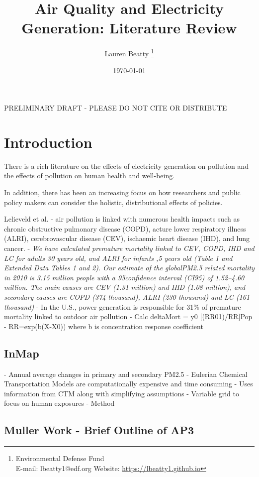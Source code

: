 \documentclass[a4paper]{article}
\title{Air Quality and Electricity Generation: Literature Review}
\author{Lauren Beatty \thanks{Environmental Defense Fund\\  E-mail: lbeatty1@edf.org \hspace{.5cm}Website: \href{https://lbeatty1.github.io}{https://lbeatty1.github.io}}}
\date{\today}
\theoremstyle{definition}
\theoremstyle{plain}
\begin{document}
\maketitle
\begin{center}
    PRELIMINARY DRAFT - PLEASE DO NOT CITE OR DISTRIBUTE
\end{center}


\newpage
\section{Introduction}

There is a rich literature on the effects of electricity generation on pollution and the effects of pollution on human health and well-being.  


In addition, there has been an increasing focus on how researchers and public policy makers can consider the holistic, distributional effects of policies.  

Lelieveld et al.  \citep{Lelieveld2015TheScale}
- air pollution is linked with numerous health impacts such as chronic obstructive pulmonary disease (COPD), acture lower respiratory illness (ALRI), cerebrovascular disease (CEV), ischaemic heart disease (IHD), and lung cancer.
- \textit{We have calculated premature mortality linked to CEV, COPD, IHD and LC for adults 30 years old, and ALRI for infants ,5 years old (Table 1 and Extended Data Tables 1 and 2). Our estimate of the globalPM2.5 related mortality in 2010 is 3.15 million people with a 95confidence interval (CI95) of 1.52–4.60 million. The main causes are CEV (1.31 million) and IHD (1.08 million), and secondary causes are COPD (374 thousand), ALRI (230 thousand) and LC (161 thousand)}
- In the U.S., power generation is responsible for 31$\%$ of premature mortality linked to outdoor air pollution
- Calc deltaMort = y0 [(RR01)/RR]Pop
- RR=exp(b(X-X0)) where b is concentration response coefficient

\subsection{InMap}
\citep{Tessum2017InMAP:Interventions}
- Annual average changes in primary and secondary PM2.5
- Eulerian Chemical Transportation Models are computationally expensive and time consuming
- Uses information from CTM along with simplifying assumptions
- Variable grid to focus on human exposures
- Method

\subsection{Muller Work - Brief Outline of AP3}
\citep{}
\end{document}
